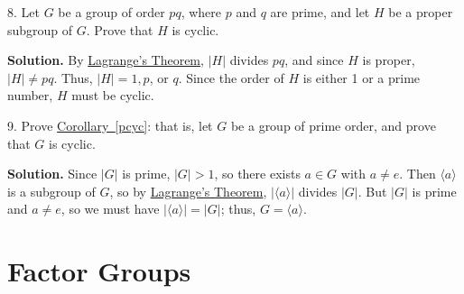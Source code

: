 \documentclass[10pt,]{book}
\theoremstyle{plain}
\theoremstyle{definition}
\theoremstyle{definition}
\theoremstyle{definition}
\theoremstyle{definition}
\numberwithin{equation}{section}
\begin{document}
\begin{exerciselist}
\begin{multicols}{4}
\end{multicols}
%
\item[8.]\hypertarget{exercise-57}{}Let \(G\) be a group of order \(pq\), where \(p\) and \(q\) are prime, and let \(H\) be a proper subgroup of \(G\). Prove that \(H\) is cyclic.%
\par\smallskip
\par\smallskip
\noindent\textbf{Solution.}\hypertarget{solution-57}{}\quad
By \hyperref[lagrange]{Lagrange's Theorem}, \(|H|\) divides \(pq\), and since \(H\) is proper, \(|H|\neq  pq\). Thus, \(|H|=1,p\), or \(q\). Since the order of \(H\) is either 1 or a prime number, \(H\) must be cyclic.%
\item[9.]\hypertarget{exercise-58}{}Prove \hyperref[pcyc]{Corollary~\ref{pcyc}}: that is, let \(G\) be a group of prime order, and prove that \(G\) is cyclic.%
\par\smallskip
\par\smallskip
\noindent\textbf{Solution.}\hypertarget{solution-58}{}\quad
Since \(|G|\) is prime, \(|G|>1\), so there exists \(a\in G\) with \(a\neq e\). Then \(\langle a\rangle\) is a subgroup of \(G\), so by \hyperref[lagrange]{Lagrange's Theorem}, \(|\langle a\rangle |\) divides \(|G|\). But \(|G|\) is prime and \(a\neq e\), so we must have \(|\langle a\rangle |=|G|\); thus, \(G=\langle a\rangle\).%
\end{exerciselist}
\typeout{************************************************}
\typeout{************************************************}
\chapter[{Factor Groups}]{Factor Groups}\label{factorgps}
\typeout{************************************************}
\typeout{************************************************}
\end{document}
